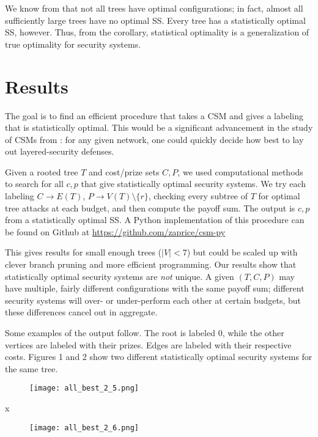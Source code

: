 \documentclass[a4paper]{amsproc}
\theoremstyle{plain}
\theoremstyle{named}
\theoremstyle{definition}
\begin{document}
We know from \cite{agk2} that not all trees have optimal configurations; in fact, almost all sufficiently large trees have no optimal SS.
Every tree has a statistically optimal SS, however.
Thus, from the corollary, statistical optimality is a generalization of true optimality for security systems.


\section{Results}

The goal is to find an efficient procedure that takes a CSM and gives a labeling that is statistically optimal.
This would be a significant advancement in the study of CSMs from \cite{agk2}: for any given network, one could quickly decide how best to lay out layered-security defenses.

Given a rooted tree $T$ and cost/prize sets $C,P$, we used computational methods to search for all $c,p$ that give statistically optimal security systems.
We try each labeling $C\rightarrow E(T)$, $P\rightarrow V(T)\setminus\{r\}$, checking every subtree of $T$ for optimal tree attacks at each budget, and then compute the payoff sum.
The output is $c,p$ from a statistically optimal SS.
A Python implementation of this procedure can be found on Github at \url{https://github.com/zaprice/csm-py}

This gives results for small enough trees ($|V|<7$) but could be scaled up with clever branch pruning and more efficient programming.
Our results show that statistically optimal security systems are \emph{not} unique.
A given $(T, C, P)$ may have multiple, fairly different configurations with the same payoff sum; different security systems will over- or under-perform each other at certain budgets, but these differences cancel out in aggregate.

Some examples of the output follow.
The root is labeled $0$, while the other vertices are labeled with their prizes.
Edges are labeled with their respective costs.
Figures 1 and 2 show two different statistically optimal security systems for the same tree.

\begin{figure}[H]
\texttt{[image: all\_best\_2\_5.png]}
\caption{}
\label{fig:M0}
\end{figure}x

\begin{figure}[H]
\texttt{[image: all\_best\_2\_6.png]}
\caption{}
\label{fig:M1}
\end{figure}
\end{document}
